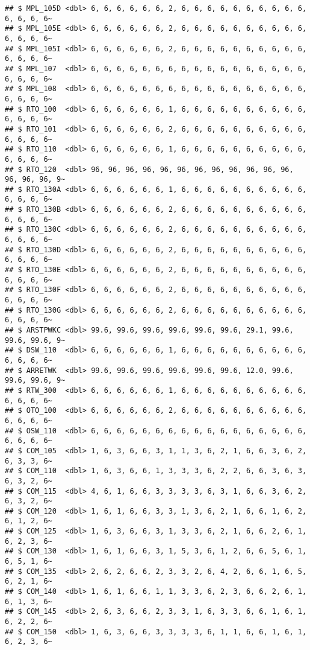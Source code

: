\documentclass[
]{article}
\begin{document}
\begin{verbatim}
## $ MPL_105D <dbl> 6, 6, 6, 6, 6, 6, 2, 6, 6, 6, 6, 6, 6, 6, 6, 6, 6, 6, 6, 6, 6~
## $ MPL_105E <dbl> 6, 6, 6, 6, 6, 6, 2, 6, 6, 6, 6, 6, 6, 6, 6, 6, 6, 6, 6, 6, 6~
## $ MPL_105I <dbl> 6, 6, 6, 6, 6, 6, 2, 6, 6, 6, 6, 6, 6, 6, 6, 6, 6, 6, 6, 6, 6~
## $ MPL_107  <dbl> 6, 6, 6, 6, 6, 6, 6, 6, 6, 6, 6, 6, 6, 6, 6, 6, 6, 6, 6, 6, 6~
## $ MPL_108  <dbl> 6, 6, 6, 6, 6, 6, 6, 6, 6, 6, 6, 6, 6, 6, 6, 6, 6, 6, 6, 6, 6~
## $ RTO_100  <dbl> 6, 6, 6, 6, 6, 6, 1, 6, 6, 6, 6, 6, 6, 6, 6, 6, 6, 6, 6, 6, 6~
## $ RTO_101  <dbl> 6, 6, 6, 6, 6, 6, 2, 6, 6, 6, 6, 6, 6, 6, 6, 6, 6, 6, 6, 6, 6~
## $ RTO_110  <dbl> 6, 6, 6, 6, 6, 6, 1, 6, 6, 6, 6, 6, 6, 6, 6, 6, 6, 6, 6, 6, 6~
## $ RTO_120  <dbl> 96, 96, 96, 96, 96, 96, 96, 96, 96, 96, 96, 96, 96, 96, 96, 9~
## $ RTO_130A <dbl> 6, 6, 6, 6, 6, 6, 1, 6, 6, 6, 6, 6, 6, 6, 6, 6, 6, 6, 6, 6, 6~
## $ RTO_130B <dbl> 6, 6, 6, 6, 6, 6, 2, 6, 6, 6, 6, 6, 6, 6, 6, 6, 6, 6, 6, 6, 6~
## $ RTO_130C <dbl> 6, 6, 6, 6, 6, 6, 2, 6, 6, 6, 6, 6, 6, 6, 6, 6, 6, 6, 6, 6, 6~
## $ RTO_130D <dbl> 6, 6, 6, 6, 6, 6, 2, 6, 6, 6, 6, 6, 6, 6, 6, 6, 6, 6, 6, 6, 6~
## $ RTO_130E <dbl> 6, 6, 6, 6, 6, 6, 2, 6, 6, 6, 6, 6, 6, 6, 6, 6, 6, 6, 6, 6, 6~
## $ RTO_130F <dbl> 6, 6, 6, 6, 6, 6, 2, 6, 6, 6, 6, 6, 6, 6, 6, 6, 6, 6, 6, 6, 6~
## $ RTO_130G <dbl> 6, 6, 6, 6, 6, 6, 2, 6, 6, 6, 6, 6, 6, 6, 6, 6, 6, 6, 6, 6, 6~
## $ ARSTPWKC <dbl> 99.6, 99.6, 99.6, 99.6, 99.6, 99.6, 29.1, 99.6, 99.6, 99.6, 9~
## $ DSW_110  <dbl> 6, 6, 6, 6, 6, 6, 1, 6, 6, 6, 6, 6, 6, 6, 6, 6, 6, 6, 6, 6, 6~
## $ ARRETWK  <dbl> 99.6, 99.6, 99.6, 99.6, 99.6, 99.6, 12.0, 99.6, 99.6, 99.6, 9~
## $ RTW_300  <dbl> 6, 6, 6, 6, 6, 6, 1, 6, 6, 6, 6, 6, 6, 6, 6, 6, 6, 6, 6, 6, 6~
## $ OTO_100  <dbl> 6, 6, 6, 6, 6, 6, 2, 6, 6, 6, 6, 6, 6, 6, 6, 6, 6, 6, 6, 6, 6~
## $ OSW_110  <dbl> 6, 6, 6, 6, 6, 6, 6, 6, 6, 6, 6, 6, 6, 6, 6, 6, 6, 6, 6, 6, 6~
## $ COM_105  <dbl> 1, 6, 3, 6, 6, 3, 1, 1, 3, 6, 2, 1, 6, 6, 3, 6, 2, 6, 3, 3, 6~
## $ COM_110  <dbl> 1, 6, 3, 6, 6, 1, 3, 3, 3, 6, 2, 2, 6, 6, 3, 6, 3, 6, 3, 2, 6~
## $ COM_115  <dbl> 4, 6, 1, 6, 6, 3, 3, 3, 3, 6, 3, 1, 6, 6, 3, 6, 2, 6, 3, 2, 6~
## $ COM_120  <dbl> 1, 6, 1, 6, 6, 3, 3, 1, 3, 6, 2, 1, 6, 6, 1, 6, 2, 6, 1, 2, 6~
## $ COM_125  <dbl> 1, 6, 3, 6, 6, 3, 1, 3, 3, 6, 2, 1, 6, 6, 2, 6, 1, 6, 2, 3, 6~
## $ COM_130  <dbl> 1, 6, 1, 6, 6, 3, 1, 5, 3, 6, 1, 2, 6, 6, 5, 6, 1, 6, 5, 1, 6~
## $ COM_135  <dbl> 2, 6, 2, 6, 6, 2, 3, 3, 2, 6, 4, 2, 6, 6, 1, 6, 5, 6, 2, 1, 6~
## $ COM_140  <dbl> 1, 6, 1, 6, 6, 1, 1, 3, 3, 6, 2, 3, 6, 6, 2, 6, 1, 6, 1, 3, 6~
## $ COM_145  <dbl> 2, 6, 3, 6, 6, 2, 3, 3, 1, 6, 3, 3, 6, 6, 1, 6, 1, 6, 2, 2, 6~
## $ COM_150  <dbl> 1, 6, 3, 6, 6, 3, 3, 3, 3, 6, 1, 1, 6, 6, 1, 6, 1, 6, 2, 3, 6~

\end{verbatim}
\end{document}
